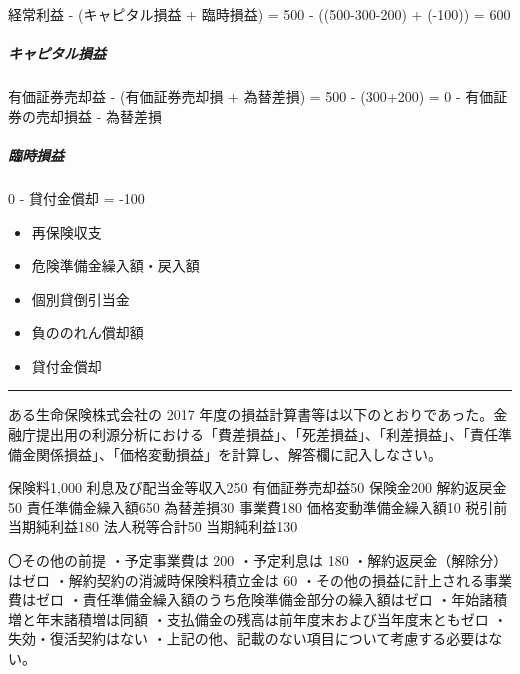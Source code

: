 \documentclass[report,gutter=10mm,fore-edge=10mm,uplatex,dvipdfmx]{jlreq}
\begin{document}
経常利益 - (キャピタル損益 + 臨時損益) = 500 - ((500-300-200) + (-100))
= 600

\subparagraph{キャピタル損益}

有価証券売却益 - (有価証券売却損 + 為替差損) = 500 - (300+200) = 0 -
有価証券の売却損益 - 為替差損

\subparagraph{臨時損益}

0 - 貸付金償却 = -100

\begin{itemize}
\tightlist
\item
  再保険収支
\item
  危険準備金繰入額・戻入額
\item
  個別貸倒引当金
\item
  負ののれん償却額
\item
  貸付金償却
\end{itemize}

\begin{center}\rule{0.5\linewidth}{0.5pt}\end{center}


ある生命保険株式会社の 2017
年度の損益計算書等は以下のとおりであった。金融庁提出用の利源分析における「費差損益」、「死差損益」、「利差損益」、「責任準備金関係損益」、「価格変動損益」を計算し、解答欄に記入しなさい。

保険料1,000 利息及び配当金等収入250 有価証券売却益50 保険金200
解約返戻金50 責任準備金繰入額650 為替差損30 事業費180
価格変動準備金繰入額10 税引前当期純利益180 法人税等合計50 当期純利益130

〇その他の前提 ・予定事業費は 200 ・予定利息は 180
・解約返戻金（解除分）はゼロ ・解約契約の消滅時保険料積立金は 60
・その他の損益に計上される事業費はゼロ
・責任準備金繰入額のうち危険準備金部分の繰入額はゼロ
・年始諸積増と年末諸積増は同額
・支払備金の残高は前年度末および当年度末ともゼロ ・失効・復活契約はない
・上記の他、記載のない項目について考慮する必要はない。

\end{document}
